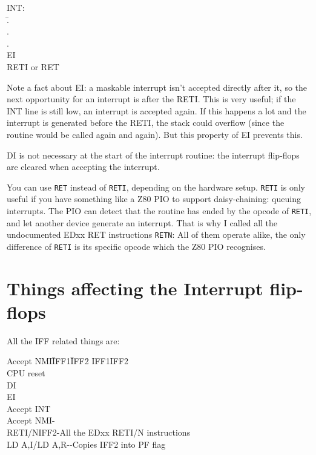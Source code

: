 \documentclass[oneside,a4paper]{book}
\begin{document}
{\ttfamily
\begin{tabbing}
INT:\\
{\qquad}\=.\\
\>.\\
\>.\\
\>EI\\
\>RETI {\rmfamily or} RET
\end{tabbing}
}

Note a fact about {\ttfamily EI}: a maskable interrupt isn't accepted directly 
after it, so the next opportunity for an interrupt is after the 
{\ttfamily RETI}. This is very useful; if the INT line is still low, an 
interrupt is accepted again.  If this happens a lot and the interrupt is 
generated before the {\ttfamily RETI}, the stack could overflow (since the 
routine would be called again and again). But this property of {\ttfamily EI} 
prevents this.

{\ttfamily DI} is not necessary at the start of the interrupt routine: the
interrupt flip-flops are cleared when accepting the interrupt.

You can use {\tt RET} instead of {\tt RETI}, depending on the hardware setup. 
{\tt RETI} is only useful if you have something like a Z80 PIO to support 
daisy-chaining: queuing interrupts. The PIO can detect that the routine has 
ended by the opcode of {\tt RETI}, and let another device generate an 
interrupt. That is why I called all the undocumented EDxx RET instructions 
{\tt RETN}: All of them operate alike, the only difference of {\tt RETI} is 
its specific opcode which the Z80 PIO recognises.


\section{Things affecting the Interrupt flip-flops}
\label{flipflop}

All the IFF related things are:

\begin{tabbing}
Accept NMI{\qquad}\=IFF1{\qquad}\=IFF2{\qquad}\= \kill
\>IFF1\>IFF2\>\\
CPU reset\\
{\ttfamily DI}\\
{\ttfamily EI}\\
Accept INT\\
Accept NMI\>-\\
{\ttfamily RETI/N}\>IFF2\>-\>All the EDxx RETI/N instructions\\
{\ttfamily LD A,I/LD A,R}\>-\>-\>Copies IFF2 into PF flag
\end{tabbing}
\end{document}
